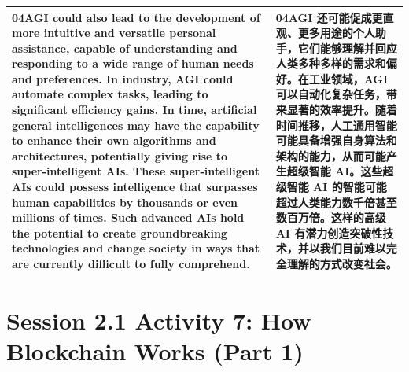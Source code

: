 \documentclass[UTF8,zihao=-4,fontset=fandol]{ctexart}
\newcommand{\TranscriptColumn}{\raggedright\arraybackslash\hyphenpenalty=10000\exhyphenpenalty=10000\sloppy}
\begin{document}
\begin{longtable}{>{\TranscriptColumn}p{} >{\TranscriptColumn}p{}}
\textbf{04}\quad AGI could also lead to the development of more intuitive and versatile personal assistance, capable of understanding and responding to a wide range of human needs and preferences. In industry, AGI could automate complex tasks, leading to significant efficiency gains. In time, artificial general intelligences may have the capability to enhance their own algorithms and architectures, potentially giving rise to super-intelligent AIs. These super-intelligent AIs could possess intelligence that surpasses human capabilities by thousands or even millions of times. Such advanced AIs hold the potential to create groundbreaking technologies and change society in ways that are currently difficult to fully comprehend. & \textbf{04}\quad AGI 还可能促成更直观、更多用途的个人助手，它们能够理解并回应人类多种多样的需求和偏好。在工业领域，AGI 可以自动化复杂任务，带来显著的效率提升。随着时间推移，人工通用智能可能具备增强自身算法和架构的能力，从而可能产生超级智能 AI。这些超级智能 AI 的智能可能超过人类能力数千倍甚至数百万倍。这样的高级 AI 有潜力创造突破性技术，并以我们目前难以完全理解的方式改变社会。 \\ \hline
\end{longtable}


\clearpage
\section{Session 2.1 Activity 7: How Blockchain Works (Part 1)}
\end{document}

